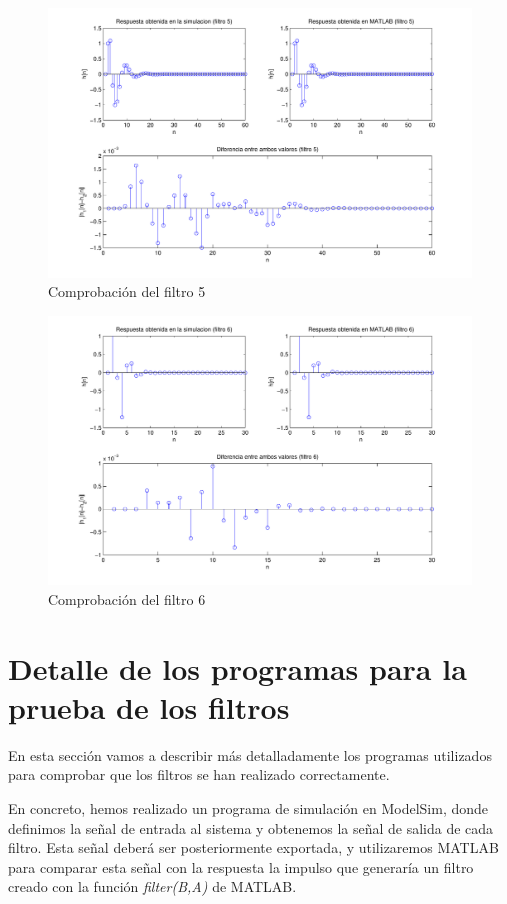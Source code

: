 \documentclass[a4paper,12pt]{article}
\begin{document}
\begin{figure}[hbt]
\includegraphics[width=\textwidth]{img/respfiltro5.pdf} 
\caption{Comprobación del filtro 5} \label{fig:filter5}
\end{figure}

\begin{figure}[hbt]
\includegraphics[width=\textwidth]{img/respfiltro6.pdf} 
\caption{Comprobación del filtro 6} \label{fig:filter6}
\end{figure}

\clearpage

\section{Detalle de los programas para la prueba de los filtros}
En esta sección vamos a describir más detalladamente los programas utilizados para comprobar que los filtros se han realizado correctamente.

En concreto, hemos realizado un programa de simulación en ModelSim, donde definimos la señal de entrada al sistema y obtenemos la señal de salida de cada filtro. Esta señal deberá ser posteriormente exportada, y utilizaremos MATLAB para comparar esta señal con la respuesta la impulso que generaría un filtro creado con la función \emph{filter(B,A)} de MATLAB.
\end{document}
